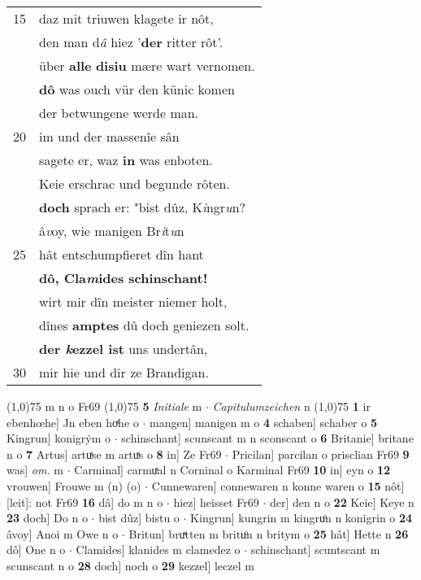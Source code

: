 \documentclass[8pt,a4paper,notitlepage]{article}
\begin{document}
\begin{table}[ht]
\begin{minipage}[t]{0.5\linewidth}
\begin{tabular}{rl}
15 & daz mit triuwen klagete ir nôt,\\ 
 & den man d\textit{â} hiez '\textbf{der} ritter rôt'.\\ 
 & über \textbf{alle} \textbf{disiu} mære wart vernomen.\\ 
 & \textbf{dô} was ouch vür den künic komen\\ 
 & der betwungene werde man.\\ 
20 & im und der massenîe sân\\ 
 & sagete er, waz \textbf{in} was enboten.\\ 
 & Keie erschrac und begunde rôten.\\ 
 & \textbf{doch} sprach er: "bist dûz, K\textit{i}ngr\textit{u}n?\\ 
 & â\textit{v}oy, wie manigen Br\textit{i}t\textit{u}n\\ 
25 & hât entschumpfieret dîn hant\\ 
 & \textbf{dô, Cla\textit{m}ides schinschant!}\\ 
 & wirt mir dîn meister niemer holt,\\ 
 & dînes \textbf{amptes} dû doch geniezen solt.\\ 
 & \textbf{der \textit{k}ezzel ist} uns undertân,\\ 
30 & mir hie und dir ze Brandigan.\\ 
\end{tabular}
\scriptsize
\line(1,0){75} \newline
m n o Fr69 \newline
\line(1,0){75} \newline
\textbf{5} \textit{Initiale} m   $\cdot$ \textit{Capitulumzeichen} n  \newline
\line(1,0){75} \newline
\textbf{1} ir ebenhœhe] Jn eben hoͯhe o  $\cdot$ mangen] manigen m o \textbf{4} schaben] schaber o \textbf{5} Kingrun] konigrẏm o  $\cdot$ schinschant] scunscant m n sconscant o \textbf{6} Britanie] britane n o \textbf{7} Artus] artuͯse m artuͯs o \textbf{8} in] Ze Fr69  $\cdot$ Pricilan] parcilan o prisclian Fr69 \textbf{9} was] \textit{om.} m  $\cdot$ Carminal] carmuͯal n Corninal o Karminal Fr69 \textbf{10} in] eyn o \textbf{12} vrouwen] Frouwe m (n) (o)  $\cdot$ Cunnewaren] connewaren n konne waren o \textbf{15} nôt] [leit]: not Fr69 \textbf{16} dâ] do m n o  $\cdot$ hiez] heisset Fr69  $\cdot$ der] den n o \textbf{22} Keie] Keye n \textbf{23} doch] Do n o  $\cdot$ bist dûz] bistu o  $\cdot$ Kingrun] kungrin m kingruͦn n konigrin o \textbf{24} âvoy] Anoi m Owe n o  $\cdot$ Britun] bruͯtten m brituͦn n britym o \textbf{25} hât] Hette n \textbf{26} dô] One n o  $\cdot$ Clamides] klanides m clamedez o  $\cdot$ schinschant] scuntscant m scunscant n o \textbf{28} doch] noch o \textbf{29} kezzel] leczel m \newline
\end{minipage}
\end{table}
\end{document}
